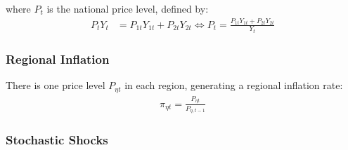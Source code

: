\documentclass[../thesis.tex]{subfiles}
\begin{document}
where $P_t$ is the national price level, defined by:
\begin{align}
	P_{t} Y_{t} &= P_{1t} Y_{1t} + P_{2t} Y_{2t} \iff P_{t} = \frac{P_{1t} Y_{1t} + P_{2t} Y_{2t}}{Y_{t}} \label{eq_v2:national-price-level}
\end{align}

\begin{comment}
	\begin{align}
		P_{t} Y_{t} &= P_{1t} Y_{1t} + P_{2t} Y_{2t} \implies \nonumber \\
		P_{t} &= \frac{Y_{1t}}{Y_{t}} P_{1t} + \frac{Y_{2t}}{Y_{t}} P_{2t} \implies \nonumber \\
		P_{t} &= \theta_{P1} P_{1t} + (1 -\theta_{P1}) P_{2t} %
	\end{align}
	
	where $\theta_{P1}$ and $(1-\theta_{P1})$ are the price level weights of regions 1 and 2 in the national price level composition, respectively:
	\begin{align}
		\left\langle \begin{matrix} \theta_{P1} & (1-\theta_{P1}) \end{matrix} \right\rangle \coloneq \left\langle \begin{matrix} \frac{Y_{1t}}{Yt} & \frac{Y_{2t}}{Yt} \end{matrix} \right\rangle \label{eq_v2:reg-ss-P1-P2-weight-in-P}
	\end{align}
\end{comment}

\subsubsection*{Regional Inflation}

There is one price level $P_{\eta t}$ in each region, generating a regional inflation rate:
\begin{align}
	\pi_{\eta t} = \frac{P_{\eta t}}{P_{\eta, t-1}} \label{eq_v2:regional-inflation}
\end{align}


\subsubsection{Stochastic Shocks}\label{sec_v2:reg-stochastic-shocks}
\end{document}

